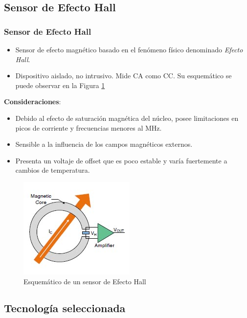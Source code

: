 \documentclass[10pt]{beamer}
\theoremstyle{remark}
\theoremstyle{definition}
\begin{document}
\subsection{Sensor de Efecto Hall}

\begin{frame}[allowframebreaks]
	\frametitle{Sensor de Efecto Hall}
	\begin{itemize}
	  \item Sensor de efecto magnético basado en el fenómeno físico denominado
		\emph{Efecto Hall}.
	  \item Dispositivo aislado, no intrusivo. Mide CA como CC. Su esquemático
		se puede observar en la Figura \ref{sch_hall}
	\end{itemize}
	
	\textbf{Consideraciones}:
	\begin{itemize}
	  \item Debido al efecto de saturación magnética del núcleo, posee
		limitaciones en picos de corriente y frecuencias menores al MHz.
	  \item Sensible a la influencia de los campos magnéticos externos.
	  \item Presenta un voltaje de offset que es poco estable y varía
		fuertemente a cambios de temperatura.
	\end{itemize}
	
	\begin{figure}[h!]
	  \includegraphics{./images/Open-loop_Hall_Sensor.jpg}
	  \caption{Esquemático de un sensor de Efecto Hall}
	  \label{sch_hall}
	\end{figure}
\end{frame}

\subsection{Tecnología seleccionada}
\end{document}

